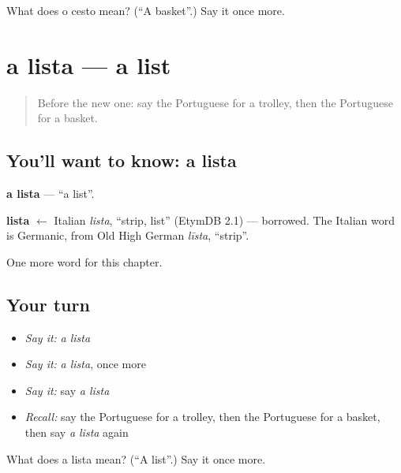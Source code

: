 \begin{tcolorbox}[breakable,colback=teal!4,colframe=teal!35!black,title={Before you move on}]
What does o cesto mean? (\textquotedblleft{}A basket\textquotedblright{}.) Say it once more.
\end{tcolorbox}
\section[a lista]{a lista — a list}

\label{lesson:PT-C167-lista}



\begin{quote}
Before the new one: say the Portuguese for a trolley, then the Portuguese for a basket.
\end{quote}

\subsection*{You'll want to know: a lista}
\textbf{a lista} — \textquotedblleft{}a list\textquotedblright{}.

\begin{cousinweb}
\textbf{lista} $\leftarrow$ Italian \emph{lista}, \textquotedblleft{}strip, list\textquotedblright{} (EtymDB 2.1) — borrowed. The Italian word is Germanic, from Old High German \emph{līsta}, \textquotedblleft{}strip\textquotedblright{}.
\end{cousinweb}

\begin{grammarlens}[title={What you've built}]
One more word for this chapter.
\end{grammarlens}

\subsection*{Your turn}
\begin{itemize}
\raggedright
  \item \emph{Say it:} \emph{a lista}
  \item \emph{Say it:} \emph{a lista}, once more
  \item \emph{Say it:} say \emph{a lista}
  \item \emph{Recall:} say the Portuguese for a trolley, then the Portuguese for a basket, then say \emph{a lista} again
\end{itemize}

\begin{tcolorbox}[breakable,colback=teal!4,colframe=teal!35!black,title={Before you move on}]
What does a lista mean? (\textquotedblleft{}A list\textquotedblright{}.) Say it once more.
\end{tcolorbox}
